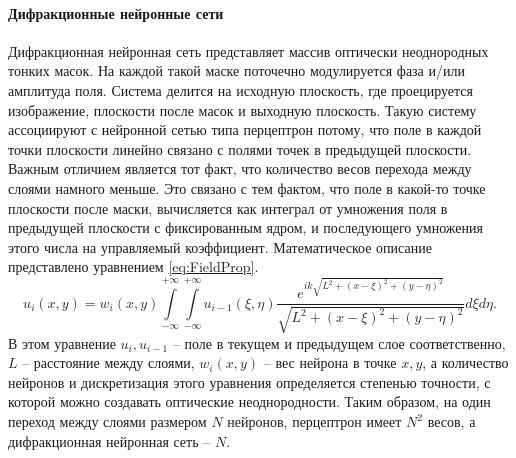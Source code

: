 \paragraph{Дифракционные нейронные сети}
Дифракционная нейронная сеть представляет массив оптически неоднородных тонких масок. На каждой такой маске поточечно модулируется фаза и/или амплитуда поля. Система делится на исходную плоскость, где проецируется изображение, плоскости после масок и выходную плоскость. Такую систему ассоциируют с нейронной сетью типа перцептрон потому, что поле в каждой точки плоскости линейно связано с полями точек в предыдущей плоскости. Важным отличием является тот факт, что количество весов перехода между слоями намного меньше. Это связано с тем фактом, что поле в какой-то точке плоскости после маски, вычисляется как интеграл от умножения поля в предыдущей плоскости с фиксированным ядром, и последующего умножения этого числа на управляемый коэффициент. Математическое описание представлено уравнением \ref{eq:FieldProp}.
\begin{equation}\label{eq:FieldProp}
	u_i(x,y) = w_i(x,y)\int\limits_{-\infty}^{+\infty}\int\limits_{-\infty}^{+\infty}u_{i-1}(\xi,\eta)\frac{e^{ik\sqrt{L^2+(x-\xi)^2+(y-\eta)^2}}}{\sqrt{L^2+(x-\xi)^2+(y-\eta)^2}} d\xi d\eta.
\end{equation}
В этом уравнение $u_i,u_{i-1}$ -- поле в текущем и предыдущем слое соответственно, $L$ -- расстояние между слоями, $w_i(x,y)$ -- вес нейрона в точке $x,y$, а количество нейронов и дискретизация этого уравнения определяется степенью точности, с которой можно создавать оптические неоднородности.
Таким образом, на один переход между слоями размером $N$ нейронов, перцептрон имеет $N^2$ весов, а дифракционная нейронная сеть -- $N$.

